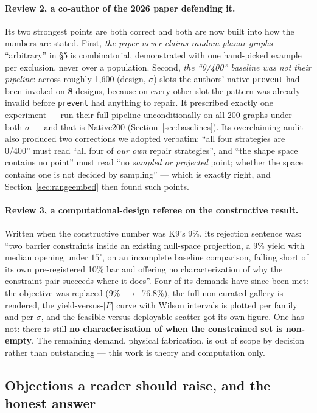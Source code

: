 \documentclass[11pt,a4paper]{article}
\theoremstyle{definition}
\newcommand{\file}[1]{\texttt{\small #1}}
\begin{document}
\paragraph{Review 2, a co-author of the 2026 paper defending it.} Its two strongest points are
both correct and both are now built into how the numbers are stated. First, \emph{the paper
never claims random planar graphs} --- ``arbitrary'' in §5 is combinatorial, demonstrated with
one hand-picked example per exclusion, never over a population. Second, \emph{the ``0/400''
baseline was not their pipeline}: across roughly 1{,}600 (design, $\sigma$) slots the authors'
native \file{prevent} had been invoked on \textbf{8} designs, because on every other slot the
pattern was already invalid before \file{prevent} had anything to repair. It prescribed
exactly one experiment --- run their full pipeline unconditionally on all 200 graphs under
both $\sigma$ --- and that is Native200 (Section~\ref{sec:baselines}). Its overclaiming audit
also produced two corrections we adopted verbatim: ``all four strategies are 0/400'' must read
``all four of \emph{our own} repair strategies'', and ``the shape space contains no point''
must read ``no \emph{sampled or projected} point; whether the space contains one is not
decided by sampling'' --- which is exactly right, and Section~\ref{sec:rangeembed} then found
such points.

\paragraph{Review 3, a computational-design referee on the constructive result.} Written when
the constructive number was K9's 9\%, its rejection sentence was: ``two barrier constraints
inside an existing null-space projection, a 9\% yield with median opening under $15^\circ$, on
an incomplete baseline comparison, falling short of its own pre-registered 10\% bar and
offering no characterization of why the constraint pair succeeds where it does''. Four of its
demands have since been met: the objective was replaced (9\%~$\to$~76.8\%), the full
non-curated gallery is rendered, the yield-versus-$|F|$ curve with Wilson intervals is plotted
per family and per $\sigma$, and the feasible-versus-deployable scatter got its own figure. One has not:
there is still \textbf{no characterisation of when the constrained set is non-empty}. The
remaining demand, physical fabrication, is out of scope by decision rather than outstanding ---
this work is theory and computation only.

\subsection{Objections a reader should raise, and the honest answer}
\end{document}
